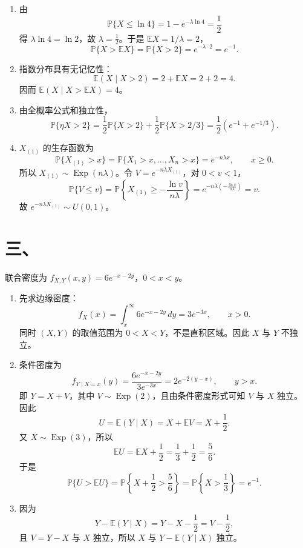 \documentclass[UTF8,zihao=-4,fontset=windows]{ctexart}
\newcommand{\Prob}{\mathbb P}
\newcommand{\EX}{\mathbb E}
\begin{document}
\begin{enumerate}
  \item 由
  \[
    \Prob\{X\le \ln 4\}=1-e^{-\lambda\ln 4}=\frac12
  \]
  得 $\lambda\ln 4=\ln 2$，故 $\lambda=\frac12$。于是 $\EX X=1/\lambda=2$，
  \[
    \Prob\{X>\EX X\}=\Prob\{X>2\}=e^{-\lambda\cdot 2}=e^{-1}.
  \]

  \item 指数分布具有无记忆性：
  \[
    \EX(X\mid X>2)=2+\EX X=2+2=4.
  \]
  因而 $\EX(X\mid X>\EX X)=4$。

  \item 由全概率公式和独立性，
  \[
    \Prob\{\eta X>2\}
    =\frac12\Prob\{X>2\}+\frac12\Prob\{X>2/3\}
    =\frac12\left(e^{-1}+e^{-1/3}\right).
  \]

  \item $X_{(1)}$ 的生存函数为
  \[
    \Prob\{X_{(1)}>x\}=\Prob\{X_1>x,\ldots,X_n>x\}=e^{-n\lambda x},
    \qquad x\ge 0.
  \]
  所以 $X_{(1)}\sim \operatorname{Exp}(n\lambda)$。令 $V=e^{-n\lambda X_{(1)}}$，对 $0<v<1$，
  \[
    \Prob\{V\le v\}
    =\Prob\left\{X_{(1)}\ge -\frac{\ln v}{n\lambda}\right\}
    =e^{-n\lambda\left(-\frac{\ln v}{n\lambda}\right)}
    =v.
  \]
  故 $e^{-n\lambda X_{(1)}}\sim U(0,1)$。
\end{enumerate}

\section*{三、}
联合密度为 $f_{X,Y}(x,y)=6e^{-x-2y}$，$0<x<y$。

\begin{enumerate}
  \item 先求边缘密度：
  \[
    f_X(x)=\int_x^\infty 6e^{-x-2y}\,dy=3e^{-3x},\qquad x>0.
  \]
  同时 $(X,Y)$ 的取值范围为 $0<X<Y$，不是直积区域。因此 $X$ 与 $Y$ 不独立。

  \item 条件密度为
  \[
    f_{Y\mid X=x}(y)=\frac{6e^{-x-2y}}{3e^{-3x}}
    =2e^{-2(y-x)},\qquad y>x.
  \]
  即 $Y=X+V$，其中 $V\sim \operatorname{Exp}(2)$，且由条件密度形式可知 $V$ 与 $X$ 独立。因此
  \[
    U=\EX(Y\mid X)=X+\EX V=X+\frac12.
  \]
  又 $X\sim \operatorname{Exp}(3)$，所以
  \[
    \EX U=\EX X+\frac12=\frac13+\frac12=\frac56.
  \]
  于是
  \[
    \Prob\{U>\EX U\}
    =\Prob\left\{X+\frac12>\frac56\right\}
    =\Prob\left\{X>\frac13\right\}
    =e^{-1}.
  \]

  \item 因为
  \[
    Y-\EX(Y\mid X)=Y-X-\frac12=V-\frac12,
  \]
  且 $V=Y-X$ 与 $X$ 独立，所以 $X$ 与 $Y-\EX(Y\mid X)$ 独立。
\end{enumerate}
\end{document}
